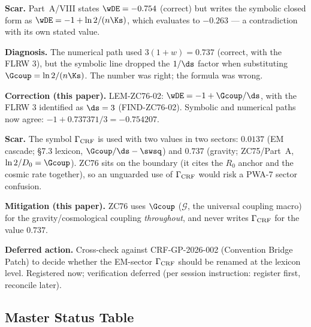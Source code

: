 \documentclass[12pt, a4paper]{article}
\begin{document}

\begin{openqbox}[title={PM-ZC76-WDE-01: The Part~A Symbolic Slip
  (pattern: approximation misclassified)}]
\textbf{Scar.}
Part~A/VIII states $\wDE = -0.754$ (correct) but writes the symbolic
closed form as $\wDE = -1 + \ln2/(n\Ks)$, which evaluates to $-0.263$
--- a contradiction with its own stated value.

\textbf{Diagnosis.}
The numerical path used $3(1+w) = 0.737$ (correct, with the FLRW $3$),
but the symbolic line dropped the $1/\ds$ factor when substituting
$\Gcoup = \ln2/(n\Ks)$. The number was right; the formula was wrong.

\textbf{Correction (this paper).}
LEM-ZC76-02: $\wDE = -1 + \Gcoup/\ds$, with the FLRW $3$ identified as
$\ds=3$ (FIND-ZC76-02). Symbolic and numerical paths now agree:
$-1 + 0.737371/3 = -0.754207$.
\end{openqbox}


\begin{openqbox}[title={PM-ZC76-NOTATION: The $\Gamma_{\rm CRF}$
  Two-Value Collision (pattern: convention mismatch)}]
\textbf{Scar.}
The symbol $\Gamma_{\rm CRF}$ is used with two values in two sectors:
$0.0137$ (EM cascade; \S7.3 lexicon, $\Gcoup/\ds - \swsq$) and $0.737$
(gravity; ZC75/Part~A, $\ln2/D_0 = \Gcoup$). ZC76 sits on the boundary
(it cites the $R_0$ anchor and the cosmic rate together), so an
unguarded use of $\Gamma_{\rm CRF}$ would risk a PWA-7 sector confusion.

\textbf{Mitigation (this paper).}
ZC76 uses $\Gcoup$ ($\mathcal{G}$, the universal coupling macro) for the
gravity/cosmological coupling \emph{throughout}, and never writes
$\Gamma_{\rm CRF}$ for the value $0.737$.

\textbf{Deferred action.}
Cross-check against CRF-GP-2026-002 (Convention Bridge Patch) to decide
whether the EM-sector $\Gamma_{\rm CRF}$ should be renamed at the
lexicon level. Registered now; verification deferred (per session
instruction: register first, reconcile later).
\end{openqbox}

\subsection{Master Status Table}
\label{sec:status}
\end{document}
